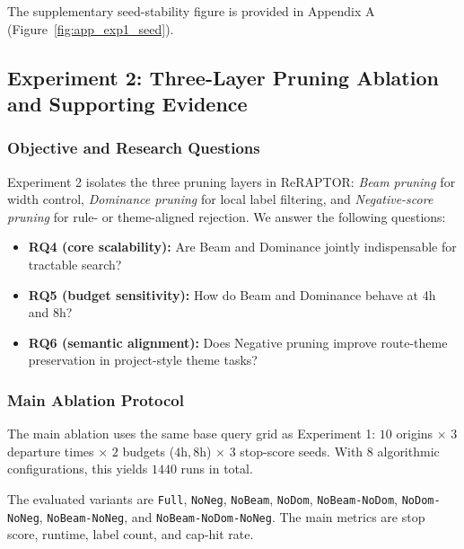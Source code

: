 The supplementary seed-stability figure is provided in Appendix A
(Figure~\ref{fig:app_exp1_seed}).

\subsection{Experiment 2: Three-Layer Pruning Ablation and Supporting Evidence}
\subsubsection{Objective and Research Questions}
Experiment 2 isolates the three pruning layers in ReRAPTOR:
\textit{Beam pruning} for width control,
\textit{Dominance pruning} for local label filtering,
and \textit{Negative-score pruning} for rule- or theme-aligned rejection.
We answer the following questions:
\begin{itemize}[leftmargin=1.5em]
    \item \textbf{RQ4 (core scalability):} Are Beam and Dominance jointly indispensable for tractable search?
    \item \textbf{RQ5 (budget sensitivity):} How do Beam and Dominance behave at 4h and 8h?
    \item \textbf{RQ6 (semantic alignment):} Does Negative pruning improve route-theme preservation in project-style theme tasks?
\end{itemize}

\subsubsection{Main Ablation Protocol}
The main ablation uses the same base query grid as Experiment 1:
\(10\) origins \(\times\) \(3\) departure times \(\times\) \(2\) budgets (\(4\mathrm{h},8\mathrm{h}\))
\(\times\) \(3\) stop-score seeds.
With \(8\) algorithmic configurations, this yields \(1440\) runs in total.


The evaluated variants are
\texttt{Full}, \texttt{NoNeg}, \texttt{NoBeam}, \texttt{NoDom},
\texttt{NoBeam-NoDom}, \texttt{NoDom-NoNeg},
\texttt{NoBeam-NoNeg}, and \texttt{NoBeam-NoDom-NoNeg}.
The main metrics are stop score, runtime, label count, and cap-hit rate.

